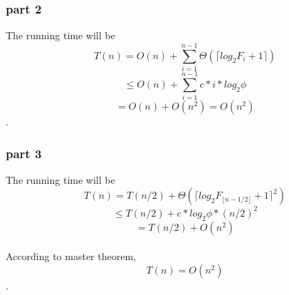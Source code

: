 \documentclass[twoside]{homework}
\begin{document}
\subsubsection*{part 2}
The running time will be $$T(n)=O(n)+\sum_{i=1}^{n-1}\Theta(\lceil log_2F_{i}+1\rceil)$$
$$\le O(n)+\sum_{i=1}^{n-1}c*i*log_2\phi$$
$$=O(n) +O(n^2)=O(n^2)$$.
\subsubsection*{part 3} 
The running time will be 
$$T(n)=T(n/2)+\Theta(\lceil log_2F_{\lfloor n-1/2\rfloor}+1\rceil^2)$$
$$\le T(n/2)+c*log_2\phi*(n/2)^2$$
$$=T(n/2)+O(n^2)$$
\\According to master theorem, $$T(n)=O(n^2)$$.
\end{document}
